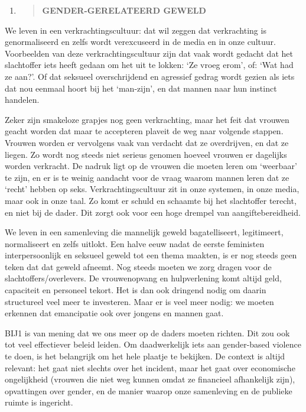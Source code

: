 \begin{enumerate}
\def\labelenumi{\arabic{enumi}.}
\setcounter{enumi}{16}
\item
  \begin{quote}
  \textbf{GENDER-GERELATEERD GEWELD}
  \end{quote}
\end{enumerate}

We leven in een verkrachtingscultuur: dat wil zeggen dat verkrachting is
genormaliseerd en zelfs wordt verexcuseerd in de media en in onze
cultuur. Voorbeelden van deze verkrachtingscultuur zijn dat vaak wordt
gedacht dat het slachtoffer iets heeft gedaan om het uit te lokken: `Ze
vroeg erom', of: `Wat had ze aan?'. Of dat seksueel overschrijdend en
agressief gedrag wordt gezien als iets dat nou eenmaal hoort bij het
`man-zijn', en dat mannen naar hun instinct handelen.

Zeker zijn smakeloze grapjes nog geen verkrachting, maar het feit dat
vrouwen geacht worden dat maar te accepteren plaveit de weg naar
volgende stappen. Vrouwen worden er vervolgens vaak van verdacht dat ze
overdrijven, en dat ze liegen. Zo wordt nog steeds niet serieus genomen
hoeveel vrouwen er dagelijks worden verkracht. De nadruk ligt op de
vrouwen die moeten leren om `weerbaar' te zijn, en er is te weinig
aandacht voor de vraag waarom mannen leren dat ze `recht' hebben op
seks. Verkrachtingscultuur zit in onze systemen, in onze media, maar ook
in onze taal. Zo komt er schuld en schaamte bij het slachtoffer terecht,
en niet bij de dader. Dit zorgt ook voor een hoge drempel van
aangiftebereidheid.

We leven in een samenleving die mannelijk geweld bagatelliseert,
legitimeert, normaliseert en zelfs uitlokt. Een halve eeuw nadat de
eerste feministen interpersoonlijk en seksueel geweld tot een thema
maakten, is er nog steeds geen teken dat dat geweld afneemt. Nog steeds
moeten we zorg dragen voor de slachtoffers/overlevers. De vrouwenopvang
en hulpverlening komt altijd geld, capaciteit en personeel tekort. Het
is dan ook dringend nodig om daarin structureel veel meer te investeren.
Maar er is veel meer nodig: we moeten erkennen dat emancipatie ook over
jongens en mannen gaat.

BIJ1 is van mening dat we ons meer op de daders moeten richten. Dit zou
ook tot veel effectiever beleid leiden. Om daadwerkelijk iets aan
gender-based violence te doen, is het belangrijk om het hele plaatje te
bekijken. De context is altijd relevant: het gaat niet slechts over het
incident, maar het gaat over economische ongelijkheid (vrouwen die niet
weg kunnen omdat ze financieel afhankelijk zijn), opvattingen over
gender, en de manier waarop onze samenleving en de publieke ruimte is
ingericht.

